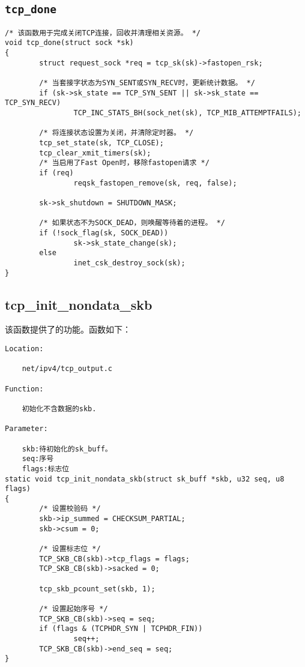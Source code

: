 \subsection{\texttt{tcp_done}}
\begin{verbatim}
/* 该函数用于完成关闭TCP连接，回收并清理相关资源。 */
void tcp_done(struct sock *sk)
{
        struct request_sock *req = tcp_sk(sk)->fastopen_rsk;

        /* 当套接字状态为SYN_SENT或SYN_RECV时，更新统计数据。 */
        if (sk->sk_state == TCP_SYN_SENT || sk->sk_state == TCP_SYN_RECV)
                TCP_INC_STATS_BH(sock_net(sk), TCP_MIB_ATTEMPTFAILS);

        /* 将连接状态设置为关闭，并清除定时器。 */
        tcp_set_state(sk, TCP_CLOSE);
        tcp_clear_xmit_timers(sk);
        /* 当启用了Fast Open时，移除fastopen请求 */
        if (req)
                reqsk_fastopen_remove(sk, req, false);

        sk->sk_shutdown = SHUTDOWN_MASK;

        /* 如果状态不为SOCK_DEAD，则唤醒等待着的进程。 */
        if (!sock_flag(sk, SOCK_DEAD))
                sk->sk_state_change(sk);
        else
                inet_csk_destroy_sock(sk);
}
\end{verbatim}

\subsection{tcp\_init\_nondata\_skb}
该函数提供了的功能。函数如下：


\begin{verbatim}
Location:

    net/ipv4/tcp_output.c
    
Function:

    初始化不含数据的skb.

Parameter:

    skb:待初始化的sk_buff。
    seq:序号
    flags:标志位
static void tcp_init_nondata_skb(struct sk_buff *skb, u32 seq, u8 flags)
{
        /* 设置校验码 */
        skb->ip_summed = CHECKSUM_PARTIAL;
        skb->csum = 0;

        /* 设置标志位 */
        TCP_SKB_CB(skb)->tcp_flags = flags;
        TCP_SKB_CB(skb)->sacked = 0;

        tcp_skb_pcount_set(skb, 1);

        /* 设置起始序号 */
        TCP_SKB_CB(skb)->seq = seq;
        if (flags & (TCPHDR_SYN | TCPHDR_FIN))
                seq++;
        TCP_SKB_CB(skb)->end_seq = seq;
}
\end{verbatim}

